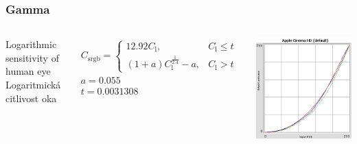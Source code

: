 \begin{frame}
    \frametitle{Gamma}

    \begin{columns}[c]
        \scriptsize
        Logarithmic sensitivity of human eye\\
        Logaritmická citlivost oka

        \begin{eqnarray*}
        C_\mathrm{srgb}=\begin{cases}
        12.92C_\mathrm{l}, & C_\mathrm{l} \le t\\
        (1+a)C_\mathrm{l}^{\frac{1}{2.4}}-a, & C_\mathrm{l} > t
        \end{cases} \\
        a = 0.055 \\
        t = 0.0031308
        \end{eqnarray*}
        
        \includegraphics[width=\textwidth]{pics/color/monitor}
    \end{columns}
\end{frame}

